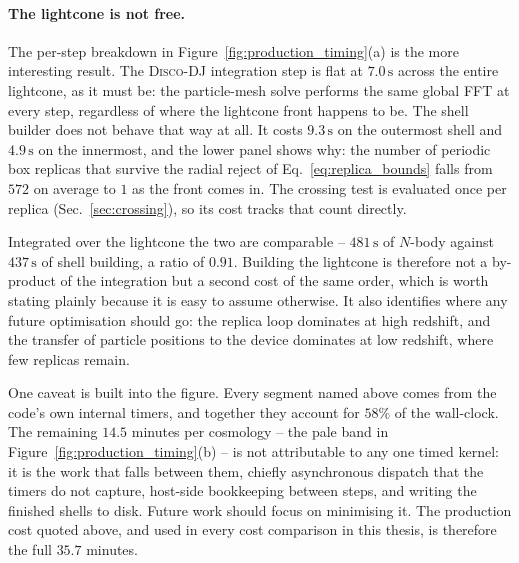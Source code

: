 \documentclass{report}
\begin{document}
\paragraph{The lightcone is not free.} The per-step breakdown in
Figure~\ref{fig:production_timing}(a) is the more interesting result. The \textsc{Disco-DJ}
integration step is flat at \mbox{$7.0\,\mathrm{s}$} across the entire lightcone,
as it must be: the particle-mesh solve performs the same global FFT at every step,
regardless of where the lightcone front happens to be. The shell builder does not behave
that way at all. It costs \mbox{$9.3\,\mathrm{s}$} on the outermost shell and
\mbox{$4.9\,\mathrm{s}$} on the innermost, and the lower panel shows why: the number of
periodic box replicas that survive the radial reject of Eq.~\eqref{eq:replica_bounds}
falls from \mbox{$572$} on average to \mbox{$1$} as the front comes in. The crossing test is evaluated
once per replica (Sec.~\ref{sec:crossing}), so its cost tracks that count directly.

Integrated over the lightcone the two are comparable -- \mbox{$481\,\mathrm{s}$} of
\mbox{$N$}-body against \mbox{$437\,\mathrm{s}$} of shell building, a ratio of
\mbox{$0.91$}. Building the lightcone is therefore not a by-product of the integration but
a second cost of the same order, which is worth stating plainly because it is easy to
assume otherwise. It also identifies where any future optimisation should go: the replica
loop dominates at high redshift, and the transfer of particle positions to the device
dominates at low redshift, where few replicas remain.

One caveat is built into the figure. Every segment named above comes from the
code's own internal timers, and together they account for \mbox{$58\%$} of the wall-clock. The remaining \mbox{$14.5$} minutes per cosmology -- the pale band in
Figure~\ref{fig:production_timing}(b) -- is not attributable to any one timed kernel: it is the work that falls between them, chiefly asynchronous dispatch that the timers do not capture, host-side bookkeeping between steps, and writing the finished shells to disk. Future work should focus on minimising it. The production cost quoted above, and used in every cost comparison in this thesis, is therefore the full \mbox{$35.7$} minutes.
\end{document}
